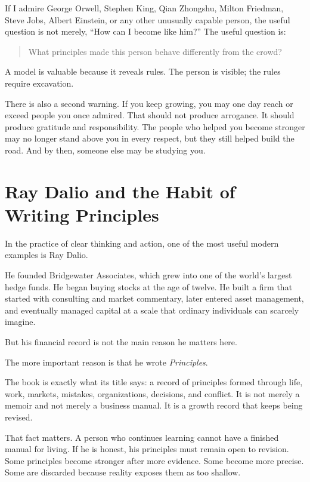 If I admire George Orwell, Stephen King, Qian Zhongshu, Milton Friedman, Steve Jobs, Albert Einstein, or any other unusually capable person, the useful question is not merely, ``How can I become like him?'' The useful question is:

\begin{quote}
What principles made this person behave differently from the crowd?
\end{quote}

A model is valuable because it reveals rules. The person is visible; the rules require excavation.

There is also a second warning. If you keep growing, you may one day reach or exceed people you once admired. That should not produce arrogance. It should produce gratitude and responsibility. The people who helped you become stronger may no longer stand above you in every respect, but they still helped build the road. And by then, someone else may be studying you.

\section*{Ray Dalio and the Habit of Writing Principles}

In the practice of clear thinking and action, one of the most useful modern examples is Ray Dalio.

He founded Bridgewater Associates, which grew into one of the world's largest hedge funds. He began buying stocks at the age of twelve. He built a firm that started with consulting and market commentary, later entered asset management, and eventually managed capital at a scale that ordinary individuals can scarcely imagine.

But his financial record is not the main reason he matters here.

The more important reason is that he wrote \emph{Principles}.

The book is exactly what its title says: a record of principles formed through life, work, markets, mistakes, organizations, decisions, and conflict. It is not merely a memoir and not merely a business manual. It is a growth record that keeps being revised.

That fact matters. A person who continues learning cannot have a finished manual for living. If he is honest, his principles must remain open to revision. Some principles become stronger after more evidence. Some become more precise. Some are discarded because reality exposes them as too shallow.

